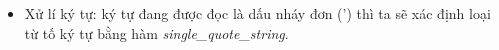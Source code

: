 \begin{itemize}








  \item Xử lí ký tự: ký tự đang được đọc là dấu nháy đơn (') thì ta sẽ xác định loại từ tố ký tự bằng hàm \textit{single\_quote\_string}.



\end{itemize}
